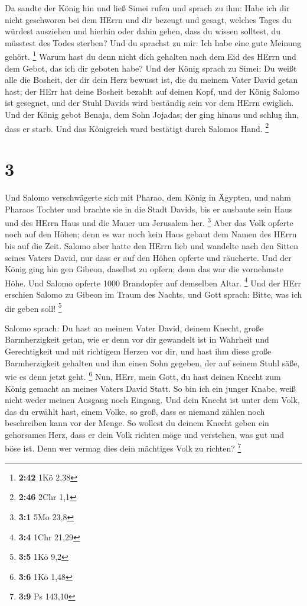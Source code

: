  Da sandte der König hin und ließ Simei rufen und sprach zu
ihm: Habe ich dir nicht geschworen bei dem HErrn und dir bezeugt und
gesagt, welches Tages du würdest ausziehen und hierhin oder dahin gehen,
dass du wissen solltest, du müsstest des Todes sterben? Und du sprachst
zu mir: Ich habe eine gute Meinung gehört. \footnote{\textbf{2:42} 1Kö
  2,38}  Warum hast du denn nicht dich gehalten nach dem
Eid des HErrn und dem Gebot, das ich dir geboten habe?  Und
der König sprach zu Simei: Du weißt alle die Bosheit, der dir dein Herz
bewusst ist, die du meinem Vater David getan hast; der HErr hat deine
Bosheit bezahlt auf deinen Kopf,  und der König Salomo ist
gesegnet, und der Stuhl Davids wird beständig sein vor dem HErrn
ewiglich.  Und der König gebot Benaja, dem Sohn Jojadas;
der ging hinaus und schlug ihn, dass er starb. Und das Königreich ward
bestätigt durch Salomos Hand. \footnote{\textbf{2:46} 2Chr 1,1}

\hypertarget{section-1}{%
\section{3}\label{section-1}}

 Und Salomo verschwägerte sich mit Pharao, dem König in
Ägypten, und nahm Pharaos Tochter und brachte sie in die Stadt Davids,
bis er ausbaute sein Haus und des HErrn Haus und die Mauer um Jerusalem
her. \footnote{\textbf{3:1} 5Mo 23,8}  Aber das Volk opferte
noch auf den Höhen; denn es war noch kein Haus gebaut dem Namen des
HErrn bis auf die Zeit.  Salomo aber hatte den HErrn lieb
und wandelte nach den Sitten seines Vaters David, nur dass er auf den
Höhen opferte und räucherte.  Und der König ging hin gen
Gibeon, daselbst zu opfern; denn das war die vornehmste Höhe. Und Salomo
opferte 1000 Brandopfer auf demselben Altar. \footnote{\textbf{3:4} 1Chr
  21,29}  Und der HErr erschien Salomo zu Gibeon im Traum
des Nachts, und Gott sprach: Bitte, was ich dir geben soll! \footnote{\textbf{3:5}
  1Kö 9,2}

 Salomo sprach: Du hast an meinem Vater David, deinem
Knecht, große Barmherzigkeit getan, wie er denn vor dir gewandelt ist in
Wahrheit und Gerechtigkeit und mit richtigem Herzen vor dir, und hast
ihm diese große Barmherzigkeit gehalten und ihm einen Sohn gegeben, der
auf seinem Stuhl säße, wie es denn jetzt geht. \footnote{\textbf{3:6}
  1Kö 1,48}  Nun, HErr, mein Gott, du hast deinen Knecht zum
König gemacht an meines Vaters David Statt. So bin ich ein junger Knabe,
weiß nicht weder meinen Ausgang noch Eingang.  Und dein
Knecht ist unter dem Volk, das du erwählt hast, einem Volke, so groß,
dass es niemand zählen noch beschreiben kann vor der Menge. 
So wollest du deinem Knecht geben ein gehorsames Herz, dass er dein Volk
richten möge und verstehen, was gut und böse ist. Denn wer vermag dies
dein mächtiges Volk zu richten? \footnote{\textbf{3:9} Ps 143,10}

